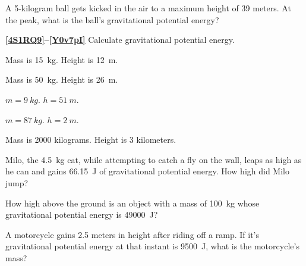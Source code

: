 \documentclass[main.tex]{subfiles}
\begin{document}
\begin{exercise} \label{Nn51QC}
    A 5-kilogram ball gets kicked in the air to a maximum height of 39 meters. At the peak, what is the ball's gravitational potential energy?
\end{exercise}
\vspace{-1ex}

\cyanhrule

\vspace{1em}

\textbf{\ref{4S1RQ9}--\ref{Y0v7pI}} Calculate gravitational potential energy.

\begin{exercise} \label{4S1RQ9}
    Mass is \SI{15}{kg}. Height is \SI{12}{m}.
\end{exercise}

\begin{exercise} \label{NS8TFJ}
    Mass is \SI{50}{kg}. Height is \SI{26}{m}.
\end{exercise}

\begin{exercise} \label{29XPZj}
    $m = \SI{9}{kg}$. $h = \SI{51}{m}$.
\end{exercise}

\begin{exercise} \label{Fv0opf}
    $m = \SI{87}{kg}$. $h = \SI{2}{m}$.
\end{exercise}

\begin{exercise} \label{Y0v7pI}
    Mass is 2000 kilograms. Height is 3 kilometers.
\end{exercise}

\begin{exercise} \label{CdBjWD}
    Milo, the \SI{4.5}{kg} cat, while attempting to catch a fly on the wall, leaps as high as he can and gains \SI{66.15}{J} of gravitational potential energy. How high did Milo jump?
\end{exercise}

\begin{exercise} \label{M8oc7x}
    How high above the ground is an object with a mass of \SI{100}{kg} whose gravitational potential energy is \SI{49000}{J}?
\end{exercise}

\begin{exercise} \label{4S3f3k}
    A motorcycle gains 2.5 meters in height after riding off a ramp. If it's gravitational potential energy at that instant is \SI{9500}{J}, what is the motorcycle's mass?
\end{exercise}
\end{document}

